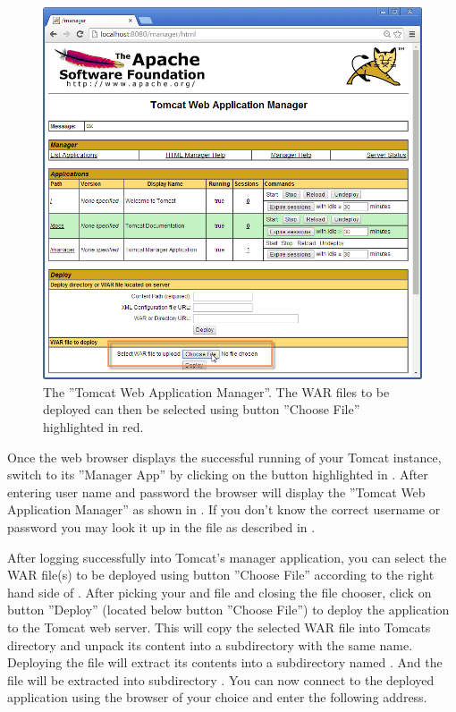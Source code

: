 \documentclass[a4paper,10pt,twoside]{book}
\begin{document}
\begin{figure}
\includegraphics[width=15cm]{tomcat_managerapp_selectwar.png}
\caption{The ''Tomcat Web Application Manager''.
The WAR files to be deployed can then be selected using button ''Choose File'' highlighted in red.}
\end{figure}

Once the web browser displays the successful running of your Tomcat instance, switch to its ''Manager App'' by clicking on the button highlighted in .
After entering user name and password the browser will display the ''Tomcat Web Application Manager'' as shown in .
If you don't know the correct username or password you may look it up in the file  as described in .

After logging successfully into Tomcat's manager application, you can select the WAR file(s) to be deployed using button ''Choose File'' according to the right hand side of .
After picking your  and  file and closing the file chooser, click on button ''Deploy'' (located below button ''Choose File'') to deploy the application to the Tomcat web server.
This will copy the selected WAR file into Tomcats  directory and unpack its content into a subdirectory with the same name.
Deploying the file  will extract its contents into a subdirectory named .
And the file  will be extracted into subdirectory .
You can now connect to the deployed application using the browser of your choice and enter the following address.
\end{document}
